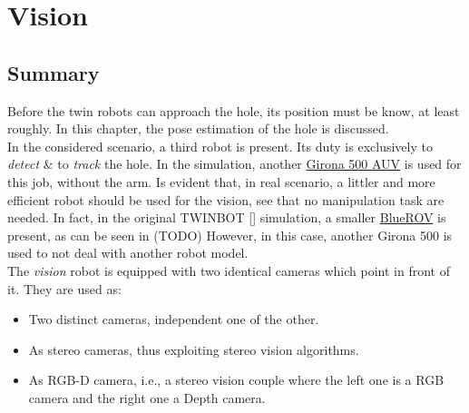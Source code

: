 

\chapter{Vision}
\label{chap:vision}
\ifpdf
    \graphicspath{{Vision/Figures/PNG/}{Vision/Figures/PDF/}{Vision/Figures/}}
\else
    \graphicspath{{Vision/Figures/EPS/}{Vision/Figures/}}
\fi

\section*{Summary}


Before the twin robots can approach the hole, its position must be know, at least roughly. In this chapter, the pose estimation of the hole is discussed.\\
In the considered scenario, a third robot is present. Its duty is exclusively to \textit{detect} \& to \textit{track} the hole. In the simulation, another \href{https://cirs.udg.edu/auvs-technology/auvs/girona-500-auv/}{Girona 500 AUV} is used for this job, without the arm. Is evident that, in real scenario, a littler and more efficient robot should be used for the vision, see that no manipulation task are needed. In fact, in the original TWINBOT [\cite{TWINBOT2019}] simulation, a smaller \href{https://bluerobotics.com/product-category/rov/bluerov2/}{BlueROV} is present, as can be seen in (TODO) %
However, in this case, another Girona 500 is used to not deal with another robot model.\\
The \textit{vision} robot is equipped with two identical cameras which point in front of it. They are used as:
\begin{itemize}
	\item Two distinct cameras, independent one of the other.
	\item As stereo cameras, thus exploiting stereo vision algorithms.
	\item As RGB-D camera, i.e., a stereo vision couple where the left one is a RGB camera and the right one a Depth camera.  
\end{itemize} 

